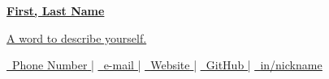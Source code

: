 

\begin{center}
    \textbf{\huge \underline{First, Last Name}}
\end{center}

\begin{center}
    \underline{A word to describe yourself.}
\end{center}

\begin{center}
    \href{tel:+886-}{
        \underline{
            \raisebox{0.0\height}{\footnotesize \faPhone}\
            {Phone Number}
        }
    } |
    \href{mailto:}{
        \underline{
            \raisebox{0.0\height}{\footnotesize \faEnvelope}\
            {e-mail}
        }
    } |
    \href{https://1chooo.com/}{
        \underline{
            \raisebox{0.0\height}{\footnotesize \faGlobe}\
            {Website}
        }
    } |
    \href{https://github.com/1chooo}{
        \underline{
            \raisebox{0.0\height}{\footnotesize \faGithub}\
            {GitHub}
        }
    } |
    \href{https://www.linkedin.com/in/1chooo/}{
        \underline{
            \raisebox{0.0\height}{\footnotesize \faLinkedin}\
            {in/nickname}
        }
    }
\end{center}
